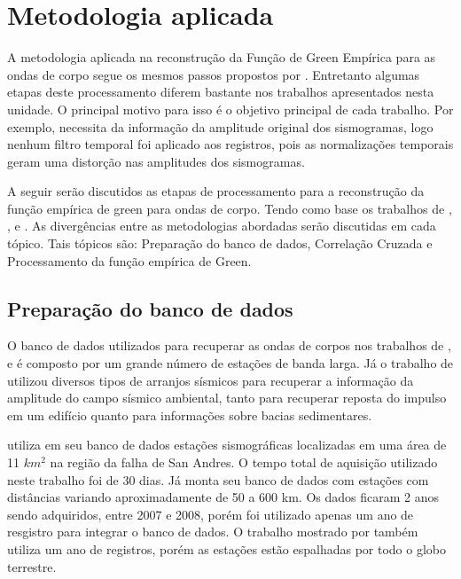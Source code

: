 \documentclass[paper,twocolumn]{geophysics}
\begin{document}
\section*{Metodologia aplicada}

A metodologia aplicada na reconstrução da Função de Green Empírica para as ondas de corpo segue os mesmos passos propostos por \cite{bensen_processing_2007}. Entretanto algumas etapas deste processamento diferem bastante nos trabalhos apresentados nesta unidade. O principal motivo para isso é o objetivo principal de cada trabalho. Por exemplo, \cite{prieto_amplitude_2011} necessita da informação da amplitude original dos sismogramas, logo nenhum filtro temporal foi aplicado aos registros, pois as normalizações temporais geram uma distorção nas amplitudes dos sismogramas. 

A seguir serão discutidos as etapas de processamento para a reconstrução da função empírica de green para  ondas de corpo. Tendo como base os trabalhos de \cite{roux_p-waves_2005}, \cite{prieto_amplitude_2011}, \cite{poli_emergence_2012} e \cite{boue_teleseismic_2013}. As divergências entre as metodologias abordadas serão discutidas em cada tópico. Tais tópicos são: Preparação do banco de dados, Correlação Cruzada e Processamento da função empírica de Green.

\subsection*{Preparação do banco de dados}

O banco de dados utilizados para recuperar as ondas de corpos nos trabalhos de \cite{roux_p-waves_2005},  \cite{poli_emergence_2012} e \cite{boue_teleseismic_2013} é composto por um grande número de estações de banda larga. Já o trabalho de \cite{prieto_amplitude_2011} utilizou diversos tipos de arranjos sísmicos para recuperar a informação da amplitude do campo sísmico ambiental, tanto para recuperar reposta do impulso em um edifício quanto para informações sobre bacias sedimentares.

\cite{roux_p-waves_2005} utiliza em seu banco de dados estações sismográficas localizadas em uma área de 11 $km^{2}$ na região da falha de San Andres. O tempo total de aquisição utilizado neste trabalho foi de 30 dias.  Já \cite{poli_emergence_2012} monta seu banco de dados com estações com distâncias variando aproximadamente de 50 a 600 km. Os dados ficaram 2 anos sendo adquiridos, entre 2007 e 2008, porém foi utilizado apenas um ano de resgistro para integrar o banco de dados. O trabalho mostrado por \cite{boue_teleseismic_2013} também utiliza um ano de registros, porém as estações estão espalhadas por todo o globo terrestre. 
\end{document}
